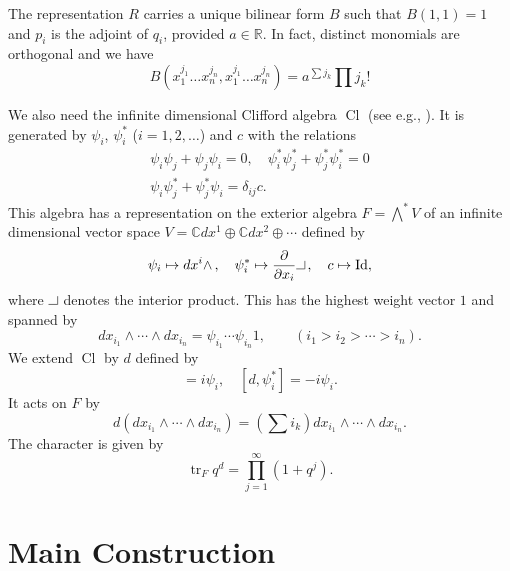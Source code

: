 \documentclass[12pt]{amsart}
\theoremstyle{definition}
\theoremstyle{remark}
\numberwithin{equation}{section}
\newcommand{\interior}{\rule{6pt}{.4pt}\rule{.4pt}{6pt}} %
\newcommand{\C}{{\mathbb C}}
\newcommand{\R}{{\mathbb R}}
\newcommand{\tr}{\operatorname{tr}}
\newcommand{\Cl}{\operatorname{Cl}} %
\begin{document}
The representation $R$ carries a unique bilinear form $B$ such that
$B(1, 1) = 1$ and $p_i$ is the adjoint of $q_i$, provided $a\in \R$.
In fact, distinct monomials are orthogonal and we have
\begin{equation*}
  B(x_1^{j_1}\dots x_n^{j_n}, x_1^{j_1}\dots x_n^{j_n})
  = a^{\sum j_k} \prod j_k !
\end{equation*}

We also need the infinite dimensional Clifford algebra $\Cl$
(see e.g., \cite{Fr}). It
is generated by $\psi_i$, $\psi^*_i$ ($i=1,2,\dots$) and $c$ with the
relations
\begin{gather}
  \psi_i\psi_j + \psi_j \psi_i = 0, \quad
  \psi_i^*\psi_j^* + \psi_j^* \psi_i^* = 0\label{eq:rel3}\\
  \psi_i\psi_j^* + \psi_j^*\psi_i = \delta_{ij}c.\label{eq:rel4}
\end{gather}
This algebra has a representation on the exterior algebra
$F = \bigwedge^* V$ of an infinite dimensional vector space
$V = \C dx^1\oplus \C dx^2\oplus\cdots$ defined by
\begin{equation*}
  \psi_i \mapsto dx^i \wedge\, , \quad
  \psi_i^* \mapsto \frac{\partial}{\partial x_i}\interior\, ,\quad
  c \mapsto \operatorname{Id},
\end{equation*}
where $\interior$ denotes the interior product.
This has the highest weight vector $1$ and spanned by
\begin{equation*}
  dx_{i_1}\wedge\cdots\wedge dx_{i_n} =
  \psi_{i_1}\cdots \psi_{i_n} 1, \qquad (i_1 > i_2 > \cdots > i_n).
\end{equation*}
We extend $\Cl$ by $d$ defined by
\begin{equation*}
  [d, \psi_i] = i\psi_i, \quad [d, \psi_i^*] = -i\psi_i.
\end{equation*}
It acts on $F$ by
\begin{equation*}
  d(dx_{i_1}\wedge\cdots\wedge dx_{i_n})
  = \left(\sum i_k\right) dx_{i_1}\wedge\cdots\wedge dx_{i_n}.
\end{equation*}
The character is given by
\begin{equation*}
  \tr_F q^d = \prod_{j=1}^\infty (1 + q^j).
\end{equation*}
%
\section{Main Construction}
\label{sec:main}
%
\end{document}
